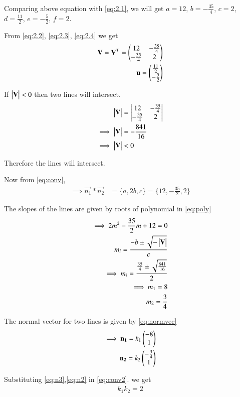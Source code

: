 \documentclass[journal,12pt,twocolumn]{IEEEtran}
\begin{document}
Comparing above equation with \eqref{eq:2.1}, we will get $a=12$, $b=-\frac{35}{4}$, $c=2$, $d=\frac{11}{2}$, $e=-\frac{5}{2}$, $f=2$.

From \eqref{eq:2.2}, \eqref{eq:2.3}, \eqref{eq:2.4} we get
\begin{align}
    \mathbf{V}=\mathbf{V}^T=\begin{pmatrix}12 & -\frac{35}{4} \\ -\frac{35}{4} & 2\end{pmatrix}\label{eq:2.48}\\
    \mathbf{u}=\begin{pmatrix}\frac{11}{2} \\ -\frac{5}{2}\end{pmatrix}\label{eq:2.49}
\end{align}

If $\begin{vmatrix}\mathbf{V}\end{vmatrix}<0$ then two lines will intersect.
\begin{align}
    \begin{vmatrix}\mathbf{V}\end{vmatrix}&=\begin{vmatrix}12 & -\frac{35}{4} \\ -\frac{35}{4} & 2\end{vmatrix}\\
    \implies\begin{vmatrix}\mathbf{V}\end{vmatrix}&=-\frac{841}{16}\\
    \implies\begin{vmatrix}\mathbf{V}\end{vmatrix}&<0
\end{align}

Therefore the lines will intersect.

Now from \eqref{eq:conv},
\begin{align}
    \implies\vec{n_1}*\vec{n_2}&=\{a,2b,c\}=\{12,-\frac{35}{2},2\}\label{eq:conv2}
\end{align}

The slopes of the lines are given by roots of polynomial in \eqref{eq:poly}
\begin{align}
    \implies 2m^2-\frac{35}{2}m+12=0\\
    m_i=\frac{-b\pm{\sqrt{-\ensuremath{\begin{vmatrix}\mathbf{V}\end{vmatrix}}}}}{c}\\
    \implies m_i=\frac{\frac{35}{4}\pm{\sqrt{\frac{841}{16}}}}{2}\\
    \implies m_1=8\\
     m_2=\frac{3}{4}
\end{align}

The normal vector for two lines is given by \eqref{eq:normvec}
\begin{align}
    \implies\mathbf{n_1}=k_1\begin{pmatrix}-8\\1\end{pmatrix}\label{eq:n3}\\
    \mathbf{n_2}=k_2\begin{pmatrix}-\frac{3}{4}\\1\end{pmatrix}\label{eq:n2}
\end{align}

Substituting \eqref{eq:n3},\eqref{eq:n2} in \eqref{eq:conv2}. we get
\begin{align}
    k_1k_2=2
\end{align}
\end{document}
